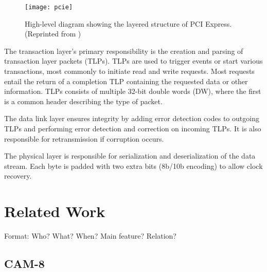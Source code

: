 \begin{figure}[!ht]
    \centering
    \texttt{[image: pcie]}
    \caption[PCI Express structure]{
        High-level diagram showing the layered structure of PCI Express. (Reprinted from \cite{pcie})
    }
    \label{fig:pcie}
\end{figure}

The transaction layer's primary responsibility is the creation and parsing of transaction layer packets (TLPs).
TLPs are used to trigger events or start various transactions, most commonly to initiate read and write requests\footnotemark.
Most requests entail the return of a completion TLP containing the requested data or other information.
TLPs consists of multiple 32-bit double words (DW), where the first is a common header describing the type of packet.

The data link layer ensures integrity by adding error detection codes to outgoing TLPs and performing error detection and correction on incoming TLPs.
It is also responsible for retransmission if corruption occurs.

The physical layer is responsible for serialization and deserialization of the data stream.
Each byte is padded with two extra bits (8b/10b encoding) to allow clock recovery.


\section{Related Work}

\TODO

Format: Who? What? When? Main feature? Relation?

\subsection{CAM-8}

